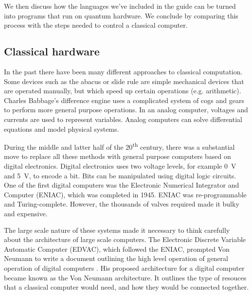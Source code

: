 We then discuss how the languages we've included in the guide can be turned into programs that run on quantum hardware. We conclude by comparing this process with the steps needed to control a classical computer.

\subsection{Classical hardware}
\label{sec:classicalquantumhardware}

In the past there have been many different approaches to classical computation. Some devices such as the abacus or slide rule are simple mechanical devices that are operated manually, but which speed up certain operations (e.g. arithmetic). Charles Babbage's difference engine uses a complicated system of cogs and gears to perform more general purpose operations. In an analog computer, voltages and currents are used to represent variables. Analog computers can solve differential equations and model physical systems.

During the middle and latter half of the 20\textsuperscript{th} century, there was a substantial move to replace all these methods with general purpose computers based on digital electronics. Digital electronics uses two voltage levels, for example \SI{0}{\volt} and \SI{5}{\volt}, to encode a bit. Bits can be manipulated using digital logic circuits. One of the first digital computers was the Electronic Numerical Integrator and Computer (ENIAC), which was completed in 1945. ENIAC was re-programmable and Turing-complete. However, the thousands of valves required made it bulky and expensive. 

The large scale nature of these systems made it necessary to think carefully about the architecture of large scale computers. The Electronic Discrete Variable Automatic Computer (EDVAC), which followed the ENIAC, prompted Von Neumann to write a document outlining the high level operation of general operation of digital computers \cite{vonneumann1993first}. His proposed architecture for a digital computer became known as the Von Neumann architecture. It outlines the type of resouces that a classical computer would need, and how they would be connected together.

